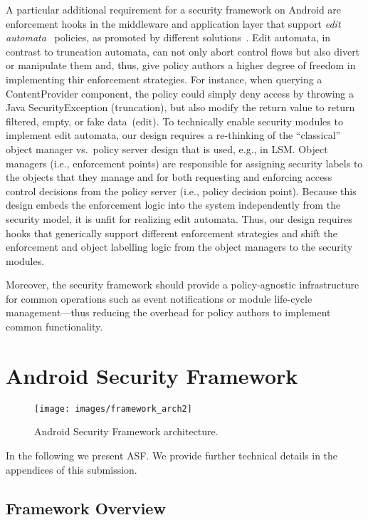 \documentclass[letterpaper,twocolumn,10pt]{article}
\newcommand{\OURSHORT}{\textsc{ASF}\xspace}
\begin{document}
A particular additional requirement for a security framework on Android are enforcement hooks in the middleware and application layer that support \textit{edit automata}~\cite{LiBaWa_05:EditAutomata} policies, as promoted by different solutions~\cite{tissa11,HoHaJuScWe_11:RetrofittingAndroid,trustdroid,Jeon2012,backes13TACAS}. Edit automata, in contrast to truncation automata, can not only abort control flows but also divert or manipulate them and, thus, give policy authors a higher degree of freedom in implementing thir enforcement strategies. For instance, when querying a ContentProvider component, the policy could simply deny access by throwing a Java SecurityException (truncation), but also modify the return value to return filtered, empty, or fake data~(edit). To technically enable security modules to implement edit automata, our design requires a re-thinking of the ``classical'' object manager vs.~policy server design that is used, e.g., in LSM. Object managers (i.e., enforcement points) are responsible for assigning security labels to the objects that they manage and for both requesting and enforcing access control decisions from the policy server (i.e., policy decision point). Because this design embeds the enforcement logic into the system independently from the security model, it is unfit for realizing edit automata. Thus, our design requires hooks that generically support different enforcement strategies and shift the enforcement and object labelling logic from the object managers to the security modules.

Moreover, the security framework should provide a policy-agnostic infrastructure for common operations such as event notifications or module life-cycle management---thus reducing the overhead for policy authors to implement common functionality.
 

\section{Android Security Framework}
\label{sec:architecture}
\begin{figure*}[t]
  \centering
  \texttt{[image: images/framework\_arch2]}
  \caption{Android Security Framework architecture.}
  \label{fig:arch}
\end{figure*}

In the following we present \OURSHORT. We provide further technical details in the appendices of this submission.

\subsection{Framework Overview}
\label{sec:arch:overview}
\end{document}
